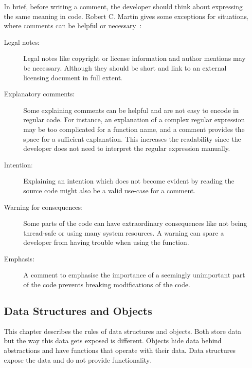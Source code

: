In brief, before writing a comment, the developer should think about expressing the same meaning in code. Robert C. Martin gives some exceptions for situations, where comments can be helpful or necessary~\cite{martin_clean_2009}:

\begin{description}
    \item[Legal notes:] Legal notes like copyright or license information and author mentions may be necessary. Although they should be short and link to an external licensing document in full extent.
    \item[Explanatory comments:] Some explaining comments can be helpful and are not easy to encode in regular code. For instance, an explanation of a complex regular expression may be too complicated for a function name, and a comment provides the space for a sufficient explanation. This increases the readability since the developer does not need to interpret the regular expression manually.
    \item[Intention:] Explaining an intention which does not become evident by reading the source code might also be a valid use-case for a comment. 
    \item[Warning for consequences:] Some parts of the code can have extraordinary consequences like not being thread-safe or using many system resources. A warning can spare a developer from having trouble when using the function.
    \item[Emphasis:] A comment to emphasise the importance of a seemingly unimportant part of the code prevents breaking modifications of the code. 
\end{description}

\subsection{Data Structures and Objects}
This chapter describes the rules of data structures and objects. Both store data but the way this data gets exposed is different. Objects hide data behind abstractions and have functions that operate with their data. Data structures expose the data and do not provide functionality. 


